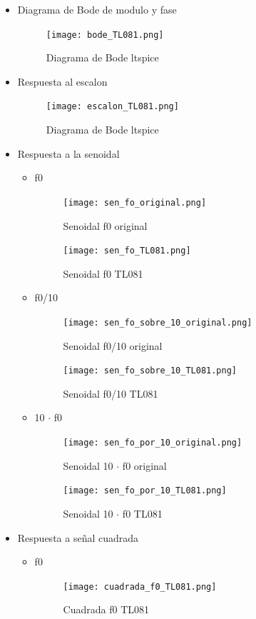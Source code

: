 \documentclass[11pt]{diazessay} %
\begin{document}
\begin{itemize}
\item Diagrama de Bode de modulo y fase
\begin{figure}[h]
\centering
	\texttt{[image: bode\_TL081.png]}
\caption{Diagrama de Bode ltspice}
\end{figure}

\newpage
\item Respuesta al escalon
\begin{figure}[h]
\centering
	\texttt{[image: escalon\_TL081.png]}
\caption{Diagrama de Bode ltspice}
\end{figure}

\newpage
\item Respuesta a la senoidal
\begin{itemize}
\item f0
\begin{figure}[h]
\centering
	\texttt{[image: sen\_fo\_original.png]}
\caption{Senoidal f0 original}
\end{figure}

\begin{figure}[h]
\centering
	\texttt{[image: sen\_fo\_TL081.png]}
\caption{Senoidal f0 TL081}
\end{figure}

\newpage
\item f0/10
\begin{figure}[h]
\centering
	\texttt{[image: sen\_fo\_sobre\_10\_original.png]}
\caption{Senoidal f0/10 original}
\end{figure}

\begin{figure}[h]
\centering
	\texttt{[image: sen\_fo\_sobre\_10\_TL081.png]}
\caption{Senoidal f0/10 TL081}
\end{figure}

\newpage
\item 10 $\cdot$ f0
\begin{figure}[h]
\centering
	\texttt{[image: sen\_fo\_por\_10\_original.png]}
\caption{Senoidal 10 $\cdot$ f0 original}
\end{figure}

\begin{figure}[h]
\centering
	\texttt{[image: sen\_fo\_por\_10\_TL081.png]}
\caption{Senoidal 10 $\cdot$ f0 TL081}
\end{figure}
\end{itemize}

\newpage
\item Respuesta a señal cuadrada
\begin{itemize}
\item f0
\begin{figure}[h]
\centering
	\texttt{[image: cuadrada\_f0\_TL081.png]}
\caption{Cuadrada f0 TL081}
\end{figure}


\end{itemize}
\end{itemize}
\end{document}
